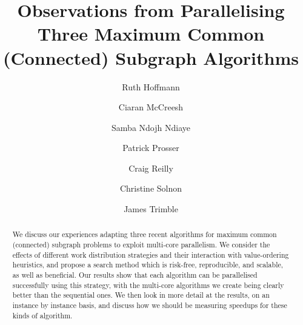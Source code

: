 \documentclass[sigconf]{acmart}
\begin{document}
\title[Observations from Parallelising Three Subgraph Algorithms]{Observations from Parallelising Three Maximum Common (Connected) Subgraph Algorithms}

\author{Ruth Hoffmann}

\author{Ciaran McCreesh}

\author{Samba Ndojh Ndiaye}

\author{Patrick Prosser}

\author{Craig Reilly}

\author{Christine Solnon}

\author{James Trimble}

\renewcommand{\shortauthors}{R. Hoffmann et al.}

\begin{abstract}
    We discuss our experiences adapting three recent algorithms for maximum common (connected) subgraph
    problems to exploit multi-core parallelism. We consider the effects of different work
    distribution strategies and their interaction with value-ordering heuristics, and propose a
    search method which is risk-free, reproducible, and scalable, as well as beneficial. Our results
    show that each algorithm can be parallelised successfully using this strategy, with the
    multi-core algorithms we create being clearly better than the sequential ones. We then look in
    more detail at the results, on an instance by instance basis, and discuss how we should be
    measuring speedups for these kinds of algorithm.
\end{abstract}
\end{document}
